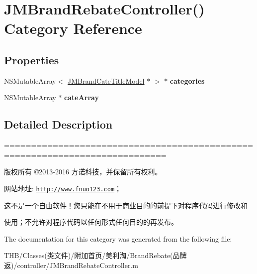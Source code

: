 \hypertarget{category_j_m_brand_rebate_controller_07_08}{}\section{J\+M\+Brand\+Rebate\+Controller() Category Reference}
\label{category_j_m_brand_rebate_controller_07_08}
\subsection*{Properties}
\begin{DoxyCompactItemize}
\item 
\mbox{\label{category_j_m_brand_rebate_controller_07_08_a71eadcc174c5892d502a436e8c2ca168}} 
N\+S\+Mutable\+Array$<$ \mbox{\hyperlink{interface_j_m_brand_cate_title_model}{J\+M\+Brand\+Cate\+Title\+Model}} $\ast$ $>$ $\ast$ {\bfseries categories}
\item 
\mbox{\label{category_j_m_brand_rebate_controller_07_08_ae9ac4b5ae4a6ce2b5e19c0305d64788a}} 
N\+S\+Mutable\+Array $\ast$ {\bfseries cate\+Array}
\end{DoxyCompactItemize}


\subsection{Detailed Description}
============================================================================

版权所有 ©2013-\/2016 方诺科技，并保留所有权利。

网站地址\+: \href{http://www.fnuo123.com}{\tt http\+://www.\+fnuo123.\+com}； 



这不是一个自由软件！您只能在不用于商业目的的前提下对程序代码进行修改和

使用；不允许对程序代码以任何形式任何目的的再发布。 

 

The documentation for this category was generated from the following file\+:\begin{DoxyCompactItemize}
\item 
T\+H\+B/\+Classes(类文件)/附加首页/美利淘/\+Brand\+Rebate(品牌返)/controller/J\+M\+Brand\+Rebate\+Controller.\+m\end{DoxyCompactItemize}
